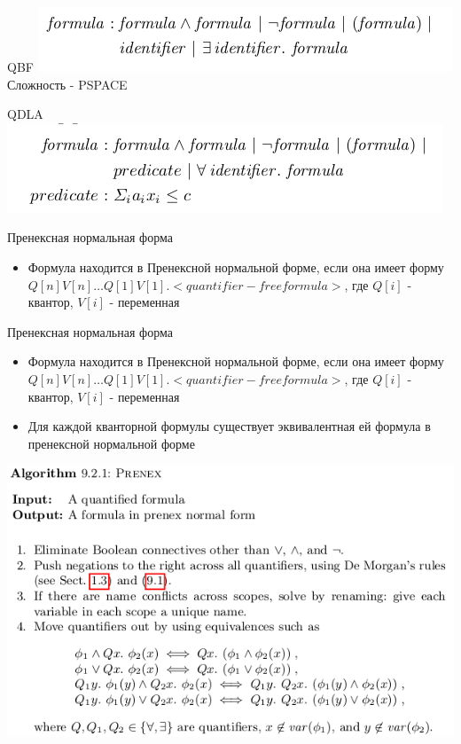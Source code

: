 \documentclass{beamer}
\begin{document}
\begin{frame}{QBF}
\includegraphics[scale=0.5]{qbf.png}\newline
Сложность - PSPACE
\end{frame}

\begin{frame}{QDLA}
\includegraphics[scale=0.5]{qdla.png}\newline
\end{frame}

\begin{frame}{Пренексная нормальная форма}
\begin{itemize}
\item Формула находится в Пренексной нормальной форме, если она имеет форму $Q[n]V[n]\dots Q[1]V[1].<quantifier-free formula>$,
где $Q[i]$ - квантор, $V[i]$ - переменная
\end{itemize}
\end{frame}

\begin{frame}{Пренексная нормальная форма}
\begin{itemize}
\item Формула находится в Пренексной нормальной форме, если она имеет форму $Q[n]V[n]\dots Q[1]V[1].<quantifier-free formula>$,
где $Q[i]$ - квантор, $V[i]$ - переменная
\item Для каждой кванторной формулы существует эквивалентная ей формула в пренексной нормальной форме
\end{itemize}
\end{frame}

\begin{frame}
\includegraphics[scale=0.5]{prenex.png}\newline
\end{frame}
\end{document}
